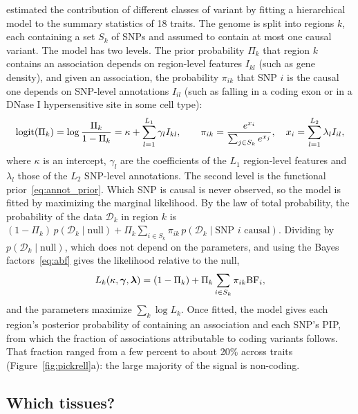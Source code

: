 \citet{pickrell2014} estimated the contribution of different classes of variant by fitting a hierarchical model to the summary statistics of 18 traits. The genome is split into regions $k$, each containing a set $S_k$ of SNPs and assumed to contain at most one causal variant. The model has two levels. The prior probability $\Pi_k$ that region $k$ contains an association depends on region-level features $I_{kl}$ (such as gene density), and given an association, the probability $\pi_{ik}$ that SNP $i$ is the causal one depends on SNP-level annotations $I_{il}$ (such as falling in a coding exon or in a DNase I hypersensitive site in some cell type):
\begin{equation}
  \operatorname{logit}(\Pi_k)=\log\frac{\Pi_k}{1-\Pi_k} = \kappa+\sum_{l=1}^{L_1}\gamma_lI_{kl},\qquad
  \pi_{ik} = \frac{e^{x_i}}{\sum_{j\in S_k}e^{x_j}},\quad x_i=\sum_{l=1}^{L_2}\lambda_lI_{il},
\end{equation}
where $\kappa$ is an intercept, $\gamma_l$ are the coefficients of the $L_1$ region-level features and $\lambda_l$ those of the $L_2$ SNP-level annotations. The second level is the functional prior~\eqref{eq:annot_prior}. Which SNP is causal is never observed, so the model is fitted by maximizing the marginal likelihood. By the law of total probability, the probability of the data $\mathcal{D}_k$ in region $k$ is $(1-\Pi_k)\,p(\mathcal{D}_k\mid\text{null})+\Pi_k\sum_{i\in S_k}\pi_{ik}\,p(\mathcal{D}_k\mid\text{SNP $i$ causal})$. Dividing by $p(\mathcal{D}_k\mid\text{null})$, which does not depend on the parameters, and using the Bayes factors~\eqref{eq:abf} gives the likelihood relative to the null,
\begin{equation}
  L_k(\kappa,\boldsymbol{\gamma},\boldsymbol{\lambda}) = (1-\Pi_k) + \Pi_k\sum_{i\in S_k}\pi_{ik}\mathrm{BF}_i,
\end{equation}
and the parameters maximize $\sum_k\log L_k$. Once fitted, the model gives each region's posterior probability of containing an association and each SNP's PIP, from which the fraction of associations attributable to coding variants follows. That fraction ranged from a few percent to about 20\% across traits (Figure~\ref{fig:pickrell}a): the large majority of the signal is non-coding.

\subsection{Which tissues?}


